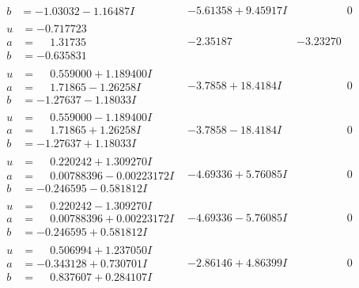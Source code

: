 \documentclass[1p]{elsarticle_modified}
\theoremstyle{definition}
\begin{document}
$$\begin{array}{c|c|c}
\begin{aligned}
b &= -1.03032 - 1.16487 I\end{aligned}
 & -5.61358 + 9.45917 I & \phantom{-0.000000 } 0 \\ \hline\begin{aligned}
u &= -0.717723\phantom{ +0.000000I} \\
a &= \phantom{-}1.31735\phantom{ +0.000000I} \\
b &= -0.635831\phantom{ +0.000000I}\end{aligned}
 & -2.35187\phantom{ +0.000000I} & -3.23270\phantom{ +0.000000I} \\ \hline\begin{aligned}
u &= \phantom{-}0.559000 + 1.189400 I \\
a &= \phantom{-}1.71865 - 1.26258 I \\
b &= -1.27637 - 1.18033 I\end{aligned}
 & -3.7858 + 18.4184 I & \phantom{-0.000000 } 0 \\ \hline\begin{aligned}
u &= \phantom{-}0.559000 - 1.189400 I \\
a &= \phantom{-}1.71865 + 1.26258 I \\
b &= -1.27637 + 1.18033 I\end{aligned}
 & -3.7858 - 18.4184 I & \phantom{-0.000000 } 0 \\ \hline\begin{aligned}
u &= \phantom{-}0.220242 + 1.309270 I \\
a &= \phantom{-}0.00788396 - 0.00223172 I \\
b &= -0.246595 - 0.581812 I\end{aligned}
 & -4.69336 + 5.76085 I & \phantom{-0.000000 } 0 \\ \hline\begin{aligned}
u &= \phantom{-}0.220242 - 1.309270 I \\
a &= \phantom{-}0.00788396 + 0.00223172 I \\
b &= -0.246595 + 0.581812 I\end{aligned}
 & -4.69336 - 5.76085 I & \phantom{-0.000000 } 0 \\ \hline\begin{aligned}
u &= \phantom{-}0.506994 + 1.237050 I \\
a &= -0.343128 + 0.730701 I \\
b &= \phantom{-}0.837607 + 0.284107 I\end{aligned}
 & -2.86146 + 4.86399 I & \phantom{-0.000000 } 0 \\ \hline\begin{aligned}

\end{aligned}
\end{array}$$
\end{document}
